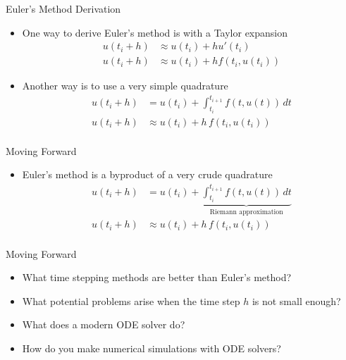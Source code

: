 \documentclass[10pt]{beamer}
\begin{document}
\begin{frame}{Euler's Method Derivation}

\begin{itemize}
    \item One way to derive Euler's method is with a Taylor expansion 
    \begin{align*}
        u(t_i+h) &\approx u(t_i) + h u'(t_i)\\        
        u(t_i+h) &\approx u(t_i) + h f(t_i, u(t_i))       
    \end{align*}
        \vfill 
    \item Another way is to use a very simple quadrature 
    \begin{align*}
        u(t_i+h) &= u(t_i) + \int_{t_i}^{t_{i+1}} f(t,u(t))\,dt\\        
        u(t_i+h) &\approx u(t_i) + h\,f(t_i,u(t_i))\\            
    \end{align*}
\end{itemize}
    
\end{frame}

\begin{frame}{Moving Forward}

\begin{itemize}
    \item Euler's method is a byproduct of a very crude quadrature 
        \begin{align*}
        u(t_i+h) &= u(t_i) + \underbrace{\int_{t_i}^{t_{i+1}} f(t,u(t))\,dt}_{\text{Riemann approximation}}\\        
        u(t_i+h) &\approx u(t_i) + h\,f(t_i,u(t_i))\\            
    \end{align*}
\end{itemize}

\end{frame}


\begin{frame}{Moving Forward}

\begin{itemize}
    \item What time stepping methods are better than Euler's method?
        \vfill 
    \item What potential problems arise when the time step $h$ is not small enough?
        \vfill 
    \item What does a modern ODE solver do? 
        \vfill  
    \item How do you make numerical simulations with ODE solvers?
\end{itemize}
    
\end{frame}
\end{document}
